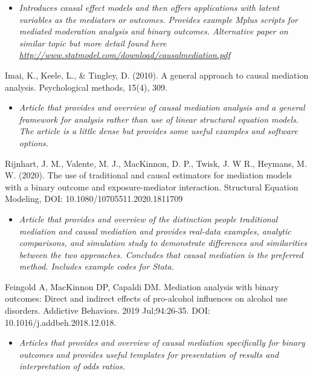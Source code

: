 \documentclass[
]{book}
\providecommand{\tightlist}{%
  \setlength{\itemsep}{0pt}\setlength{\parskip}{0pt}}
\begin{document}
\begin{itemize}
\tightlist
\item
  \emph{Introduces causal effect models and then offers applications with latent variables as the mediators or outcomes. Provides example Mplus scripts for mediated moderation analysis and binary outcomes. Alternative paper on similar topic but more detail found here \url{http://www.statmodel.com/download/causalmediation.pdf}}
\end{itemize}

Imai, K., Keele, L., \& Tingley, D. (2010). A general approach to causal mediation analysis. Psychological methods, 15(4), 309.

\begin{itemize}
\tightlist
\item
  \emph{Article that provides and overview of causal mediation analysis and a general framework for analysis rather than use of linear structural equation models. The article is a little dense but provides some useful examples and software options. }
\end{itemize}

Rijnhart, J. M., Valente, M. J., MacKinnon, D. P., Twisk, J. W R., Heymans, M. W. (2020). The use of traditional and causal estimators for mediation models with a binary outcome and exposure-mediator interaction. Structural Equation Modeling, DOI: 10.1080/10705511.2020.1811709

\begin{itemize}
\tightlist
\item
  \emph{Article that provides and overview of the distinction people traditional mediation and causal mediation and provides real-data examples, analytic comparisons, and simulation study to demonstrate differences and similarities between the two approaches. Concludes that causal mediation is the preferred method. Includes example codes for Stata. }
\end{itemize}

Feingold A, MacKinnon DP, Capaldi DM. Mediation analysis with binary outcomes: Direct and indirect effects of pro-alcohol influences on alcohol use disorders. Addictive Behaviors. 2019 Jul;94:26-35. DOI: 10.1016/j.addbeh.2018.12.018.

\begin{itemize}
\tightlist
\item
  \emph{Articles that provides and overview of causal mediation specifically for binary outcomes and provides useful templates for presentation of results and interpretation of odds ratios.}
\end{itemize}
\end{document}
